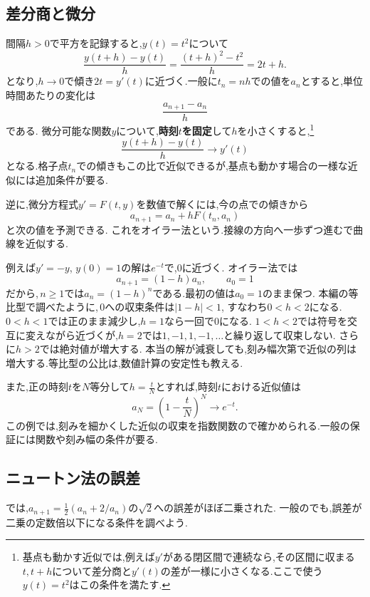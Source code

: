 



\subsection{差分商と微分}
間隔$h>0$で平方を記録すると,$y(t)=t^2$について
\[
  \frac{y(t+h)-y(t)}h
  =\frac{(t+h)^2-t^2}h=2t+h.
\]
となり,$h\to0$で傾き$2t=y'(t)$に近づく.一般に$t_n=nh$での値を$a_n$とすると,単位時間あたりの変化は
\[
  \frac{a_{n+1}-a_n}{h}
\]
である.
微分可能な関数$y$について,\textbf{時刻$t$を固定}して$h$を小さくすると,\footnote{基点も動かす近似では,例えば$y'$がある閉区間で連続なら,その区間に収まる$t,t+h$について差分商と$y'(t)$の差が一様に小さくなる.ここで使う$y(t)=t^2$はこの条件を満たす.}
\[
  \frac{y(t+h)-y(t)}h\longrightarrow y'(t)
\]
となる.格子点$t_n$での傾きもこの比で近似できるが,基点も動かす場合の一様な近似には追加条件が要る.

逆に,微分方程式$y'=F(t,y)$を数値で解くには,今の点での傾きから
\[
  a_{n+1}=a_n+hF(t_n,a_n)
\]
と次の値を予測できる.
これをオイラー法という.接線の方向へ一歩ずつ進むで曲線を近似する.

例えば$y'=-y$, $y(0)=1$の解は$e^{-t}$で,$0$に近づく.
オイラー法では
\[
  a_{n+1}=(1-h)a_n,\qquad a_0=1
\]
だから,\,$n\ge1$では$a_n=(1-h)^n$である.最初の値は$a_0=1$のまま保つ.
本編の等比型で調べたように,\,$0$への収束条件は$|1-h|<1$, すなわち$0<h<2$になる.
$0<h<1$では正のまま減少し,$h=1$なら一回で$0$になる.
$1<h<2$では符号を交互に変えながら近づくが,$h=2$では$1,-1,1,-1,\ldots$と繰り返して収束しない.
さらに$h>2$では絶対値が増大する.
本当の解が減衰しても,刻み幅次第で近似の列は増大する.等比型の公比は,数値計算の安定性も教える.

また,正の時刻$t$を$N$等分して$\displaystyle h=\frac{t}{N}$とすれば,時刻$t$における近似値は
\[
  a_N=\left(1-\frac{t}{N}\right)^N
  \longrightarrow e^{-t}.
\]
この例では,刻みを細かくした近似の収束を指数関数ので確かめられる.一般の保証には関数や刻み幅の条件が要る.

\subsection{ニュートン法の誤差}
では,$a_{n+1}=\frac12(a_n+2/a_n)$の$\sqrt2$への誤差がほぼ二乗された.
一般のでも,誤差が二乗の定数倍以下になる条件を調べよう.

